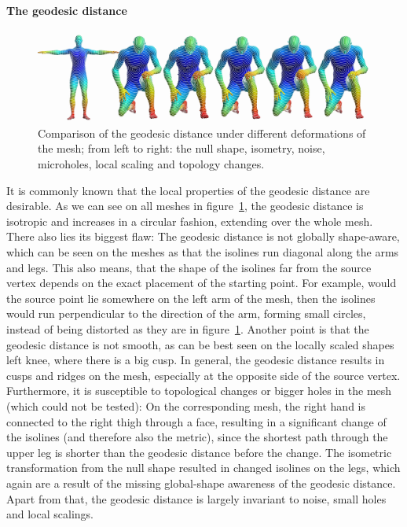 \paragraph{The geodesic distance}
\begin{figure}[h]
	\centering
	\includegraphics[width = \textwidth]{../results/geodesic_isolines}
	\caption{Comparison of the geodesic distance under different deformations of the mesh; from left to right: the null shape, isometry, noise, microholes, local scaling and topology changes.}
	\label{fig:geo_isolines}
\end{figure}
It is commonly known that the local properties of the geodesic distance are desirable.
As we can see on all meshes in figure~\ref{fig:geo_isolines}, the geodesic distance is isotropic and increases in a circular fashion, extending over the whole mesh.
There also lies its biggest flaw:
The geodesic distance is not globally shape-aware, which can be seen on the meshes as that the isolines run diagonal along the arms and legs.
This also means, that the shape of the isolines far from the source vertex depends on the exact placement of the starting point.
For example, would the source point lie somewhere on the left arm of the mesh, then the isolines would run perpendicular to the direction of the arm, forming small circles, instead of being distorted as they are in figure~\ref{fig:geo_isolines}.
Another point is that the geodesic distance is not smooth, as can be best seen on the locally scaled shapes left knee, where there is a big cusp.
In general, the geodesic distance results in cusps and ridges on the mesh, especially at the opposite side of the source vertex.
Furthermore, it is susceptible to topological changes or bigger holes in the mesh (which could not be tested):
On the corresponding mesh, the right hand is connected to the right thigh through a face, resulting in a significant change of the isolines (and therefore also the metric), since the shortest path through the upper leg is shorter than the geodesic distance before the change.
The isometric transformation from the null shape resulted in changed isolines on the legs, which again are a result of the missing global-shape awareness of the geodesic distance.
Apart from that, the geodesic distance is largely invariant to noise, small holes and local scalings.

